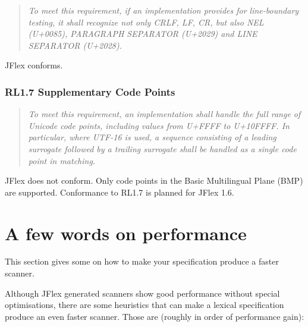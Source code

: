 \documentclass[11pt]{scrartcl}
\newcommand{\nextver}{1.6}
\begin{document}
\begin{quote}
\emph{To meet this requirement, if an implementation provides for
line-boundary testing, it shall recognize not only CRLF, LF, CR, but
also NEL (U+0085), PARAGRAPH SEPARATOR (U+2029) and LINE SEPARATOR
(U+2028).}
\end{quote}

JFlex conforms.

\subsubsection*{RL1.7 Supplementary Code Points}

\begin{quote}
\emph{To meet this requirement, an implementation shall handle the full
range of Unicode code points, including values from U+FFFF to U+10FFFF.
In particular, where UTF-16 is used, a sequence consisting of a leading
surrogate followed by a trailing surrogate shall be handled as a single
code point in matching.}
\end{quote}

JFlex does not conform.  Only code points in the Basic Multilingual
Plane (BMP) are supported.  Conformance to RL1.7 is planned for JFlex
\nextver.


\section{A few words on performance}
\label{PerformanceTips}\label{performance}

This section gives some  on how to make
your specification produce a faster scanner. 

Although JFlex generated scanners show good performance without
special optimisations, there are some heuristics that can make a
lexical specification produce an even faster scanner. Those are
(roughly in order of performance gain):
 
\end{document}
